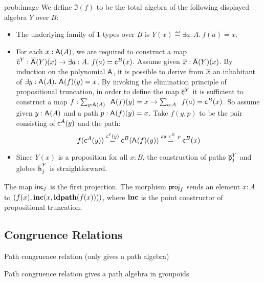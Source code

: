 \begin{construction}{prob:image}
We define $\Im(f)$ to be the total algebra of the following displayed algebra $Y$ over $B$:
\begin{itemize}
\item The underlying family of 1-types over $B$ is $Y(x) \eqdef \exists a : A.\ f(a) = x$.
\item For each $x : \mathsf{A}^{}(A)$, we are required to construct
a map $\overline{\mathsf{c}}^{Y} : \overline{\mathsf{A}^{}}(Y)(x) \rightarrow
\exists a : A.\ f(a) = \mathsf{c}^{B}(x)$. Assume given $\overline{x}
: \overline{\mathsf{A}^{}}(Y)(x)$. By induction on the polynomial
$\mathsf{A}^{}$, it is possible to derive from $\overline{x}$ an
inhabitant of $\exists y
: \mathsf{A}^{}(A).\ \mathsf{A}^{}(f)(y) = x$. By
invoking the elimination principle of propositional truncation, in
order to define the map $\overline{\mathsf{c}}^{Y}$ it is sufficient to
construct a map $f : \Sum {y
: \polyAct{\pointconstr}{A}}.\ \polyAct{\pointconstr}{f}(y) =
x \rightarrow \Sum {a : A}.\ f(a) = \AlgPoint{B}(x)$.  So assume given
$y : \mathsf{A}^{}(A)$ and a path $p
: \mathsf{A}^{}(f)(y) = x$. Take $f(y,p)$ to be the pair
consisting of $\mathsf{c}^{A}(y)$ and the path:
\[
f(\mathsf{c}^{A}(y))
\stackrel{\mathsf{c}^{f}(y)}{=}
\mathsf{c}^{B}(\mathsf{A}^{}(f)(y))
\stackrel{\mathsf{ap} \ \mathsf{c}^{B} \ p}{=}
\mathsf{c}^{B}(x)
\]
\item Since $Y(x)$ is a proposition for all $x : B$, the construction of
paths $\overline{\mathsf{p}}^{Y}_{j}$ and globes $\overline{\mathsf{h}}^{Y}_{j}$ is
straightforward.
\end{itemize}

The map $\mathsf{inc}_{f}$ is the first projection.
The morphism $\mathsf{proj}_{f}$ sends an element $x : A$ to
$(f(x),\operatorname{\mathbf{inc}}(x,\operatorname{\mathbf{idpath}}(f(x))))$, where $\operatorname{\mathbf{inc}}$ is the point constructor of
propositional truncation. 
\end{construction}

\subsection{Congruence Relations}

\begin{definition}
Path congruence relation (only gives a path algebra)
\end{definition}

\begin{problem}
\label{prob:path_congruence_relation_to_grpd}
Path congruence relation gives a path algebra in groupoids
\end{problem}

